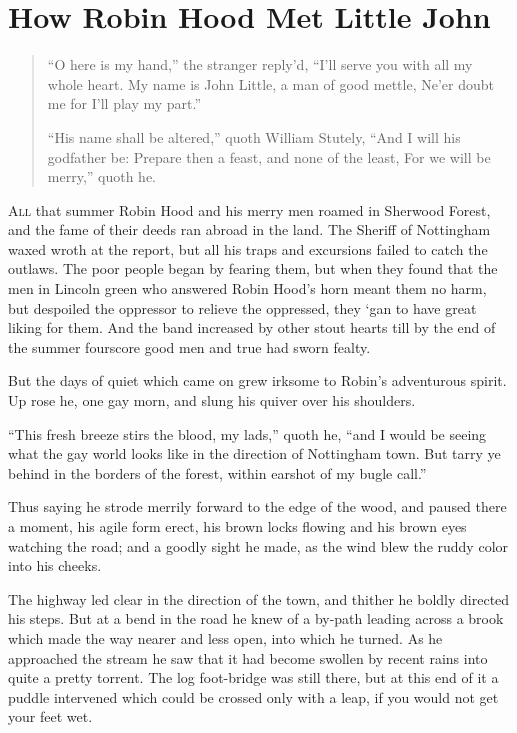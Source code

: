 \chapter{How Robin Hood Met Little John}

\begin{quote}
“O here is my hand,” the stranger reply’d,
“I’ll serve you with all my whole heart.
My name is John Little, a man of good mettle,
Ne’er doubt me for I’ll play my part.”

“His name shall be altered,” quoth William Stutely,
“And I will his godfather be:
Prepare then a feast, and none of the least,
For we will be merry,” quoth he.
\end{quote}

\lettrine{A}{ll} that summer Robin Hood and his merry men roamed in Sherwood Forest,
and the fame of their deeds ran abroad in the land. The Sheriff of
Nottingham waxed wroth at the report, but all his traps and excursions
failed to catch the outlaws. The poor people began by fearing them, but
when they found that the men in Lincoln green who answered Robin Hood's
horn meant them no harm, but despoiled the oppressor to relieve the
oppressed, they `gan to have great liking for them. And the band
increased by other stout hearts till by the end of the summer fourscore
good men and true had sworn fealty.

But the days of quiet which came on grew irksome to Robin's adventurous
spirit. Up rose he, one gay morn, and slung his quiver over his
shoulders.

``This fresh breeze stirs the blood, my lads,'' quoth he, ``and I would
be seeing what the gay world looks like in the direction of Nottingham
town. But tarry ye behind in the borders of the forest, within earshot
of my bugle call.''

Thus saying he strode merrily forward to the edge of the wood, and
paused there a moment, his agile form erect, his brown locks flowing and
his brown eyes watching the road; and a goodly sight he made, as the
wind blew the ruddy color into his cheeks.

The highway led clear in the direction of the town, and thither he
boldly directed his steps. But at a bend in the road he knew of a
by-path leading across a brook which made the way nearer and less open,
into which he turned. As he approached the stream he saw that it had
become swollen by recent rains into quite a pretty torrent. The log
foot-bridge was still there, but at this end of it a puddle intervened
which could be crossed only with a leap, if you would not get your feet
wet.

